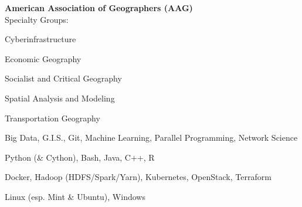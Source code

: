\documentclass{acmresume}
\begin{document}
    \vspace{0.5cm}


    \textbf{American Association of Geographers (AAG)} \\
    Specialty Groups: \\ \vspace{-.3cm}
    \begin{multicols}{3}
    \begin{titemize}
        \item Cyberinfrastructure
        \item Economic Geography
        \item Socialist and Critical Geography
        \item Spatial Analysis and Modeling
        \item Transportation Geography
    \end{titemize}
    \end{multicols}
	\vspace{0.5cm}
	
	
	
	\vspace{0.5cm}

	
	\begin{description}[topsep=1pt,itemsep=1pt]
		 Big Data, G.I.S., Git, Machine Learning, Parallel Programming, Network Science
		
		 Python (\& Cython), Bash, Java, C++, R
		
		 Docker, Hadoop (HDFS/Spark/Yarn), Kubernetes, OpenStack, Terraform
		
		 Linux (esp. Mint \& Ubuntu), Windows
	\end{description}
\end{document}
